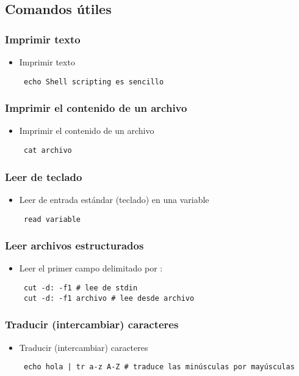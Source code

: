 \subsection{Comandos útiles}

\begin{frame}[fragile]
  \frametitle{Imprimir texto}
  \begin{itemize}
    \item Imprimir texto
   \begin{lstlisting}
 echo Shell scripting es sencillo
   \end{lstlisting}
  \end{itemize}
\end{frame}

\begin{frame}[fragile]
  \frametitle{Imprimir el contenido de un archivo}
  \begin{itemize}
    \item Imprimir el contenido de un archivo
   \begin{lstlisting}
 cat archivo
   \end{lstlisting}
  \end{itemize}
\end{frame}

\begin{frame}[fragile]
  \frametitle{Leer de teclado}
  \begin{itemize}
    \item Leer de entrada estándar (teclado) en una variable
   \begin{lstlisting}
 read variable
   \end{lstlisting}
  \end{itemize}
\end{frame}

\begin{frame}[fragile]
  \frametitle{Leer archivos estructurados}
  \begin{itemize}
    \item Leer el primer campo delimitado por :
   \begin{lstlisting}
 cut -d: -f1 # lee de stdin
 cut -d: -f1 archivo # lee desde archivo
   \end{lstlisting}
  \end{itemize}
\end{frame}

\begin{frame}[fragile]
  \frametitle{Traducir (intercambiar) caracteres}
  \begin{itemize}
    \item Traducir (intercambiar) caracteres
   \begin{lstlisting}
 echo hola | tr a-z A-Z # traduce las minúsculas por mayúsculas
   \end{lstlisting}
  \end{itemize}
\end{frame}

